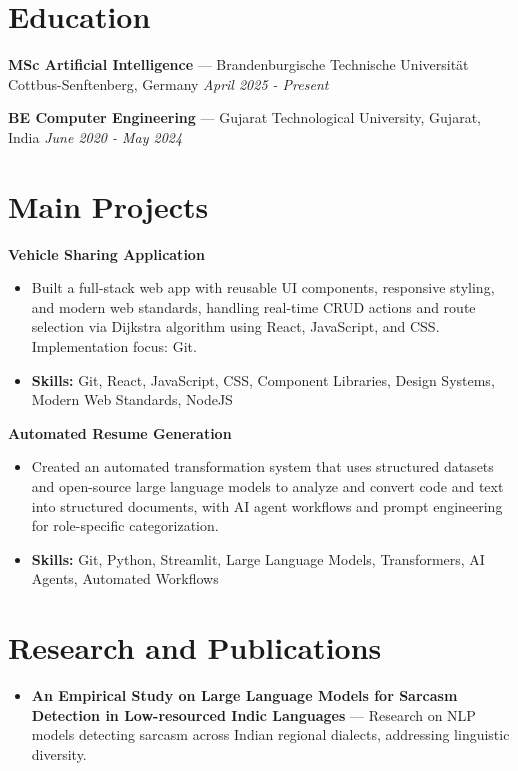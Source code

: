 \documentclass[a4paper,10pt]{article}
\begin{document}
\section*{Education}
\textbf{MSc Artificial Intelligence} — Brandenburgische Technische Universität Cottbus-Senftenberg, Germany \hfill \textit{April 2025 - Present}\par
\vspace{1.5pt}
\textbf{BE Computer Engineering} — Gujarat Technological University, Gujarat, India \hfill \textit{June 2020 - May 2024}\par

\section*{Main Projects}
\textbf{Vehicle Sharing Application}\par
\vspace{1pt}
\begin{itemize}
  \item Built a full-stack web app with reusable UI components, responsive styling, and modern web standards, handling real-time CRUD actions and route selection via Dijkstra algorithm using React, JavaScript, and CSS. Implementation focus: Git.
  \item \textbf{Skills:} Git, React, JavaScript, CSS, Component Libraries, Design Systems, Modern Web Standards, NodeJS
\end{itemize}
\vspace{3pt}
\textbf{Automated Resume Generation}\par
\vspace{1pt}
\begin{itemize}
  \item Created an automated transformation system that uses structured datasets and open-source large language models to analyze and convert code and text into structured documents, with AI agent workflows and prompt engineering for role-specific categorization.
  \item \textbf{Skills:} Git, Python, Streamlit, Large Language Models, Transformers, AI Agents, Automated Workflows
\end{itemize}

\section*{Research and Publications}
\begin{itemize}
\item \textbf{An Empirical Study on Large Language Models for Sarcasm Detection in Low-resourced Indic Languages} — Research on NLP models detecting sarcasm across Indian regional dialects, addressing linguistic diversity.
\end{itemize}
\end{document}
